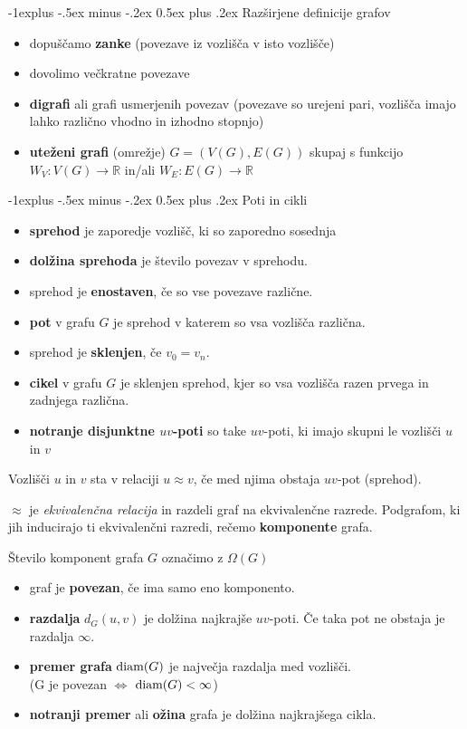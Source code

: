 \documentclass[a4paper,8pt]{extarticle}
\makeatletter
\renewcommand{\subsection}{\@startsection{subsection}{2}{0mm}%
                                {-1explus -.5ex minus -.2ex}%
                                {0.5ex plus .2ex}%
                                {\normalfont\normalsize\bfseries}}
\makeatother
\begin{document}
\begin{multicols}{4}
\subsection{Razširjene definicije grafov}
\begin{itemize}
    \item dopuščamo \textbf{zanke} (povezave iz vozlišča v isto vozlišče)
    \item dovolimo večkratne povezave
    \item \textbf{digrafi} ali grafi usmerjenih povezav (povezave so urejeni pari, vozlišča imajo lahko različno vhodno in izhodno stopnjo)
    \item \textbf{uteženi grafi} (omrežje) $G = (V(G), E(G))$ skupaj s funkcijo $W_V : V(G) \to \mathbb{R}$ in/ali $W_E: E(G) \to \mathbb{R}$
\end{itemize}

\subsection{Poti in cikli}
\begin{itemize}
    \item \textbf{sprehod} je zaporedje vozlišč, ki so zaporedno sosednja
    \item \textbf{dolžina sprehoda} je število povezav v sprehodu.
    \item sprehod je \textbf{enostaven}, če so vse povezave različne.
    \item \textbf{pot} v grafu $G$ je sprehod v katerem so vsa vozlišča različna.
    \item sprehod je \textbf{sklenjen}, če $v_0 = v_n$.
    \item \textbf{cikel} v grafu $G$ je sklenjen sprehod, kjer so vsa vozlišča razen prvega in zadnjega različna.
    \item \textbf{notranje disjunktne $uv$-poti} so take $uv$-poti, ki imajo skupni le vozlišči $u$ in $v$
\end{itemize}

Vozlišči $u$ in $v$ sta v relaciji $u \approx v$, če med njima obstaja $uv$-pot (sprehod).

$\approx$ je \emph{ekvivalenčna relacija} in razdeli graf na ekvivalenčne razrede. 
Podgrafom, ki jih inducirajo ti ekvivalenčni razredi, rečemo \textbf{komponente} grafa.

Število komponent grafa $G$ označimo z $\Omega(G)$

\begin{itemize}
    \item graf je \textbf{povezan}, če ima samo eno komponento.
    \item \textbf{razdalja} $d_G(u,v)$ je dolžina najkrajše $uv$-poti. Če taka pot ne obstaja je razdalja $\infty$.
    \item \textbf{premer grafa} $\textmd{diam}(G)$ je največja razdalja med vozlišči.\\
    (G je povezan $\Leftrightarrow$ $\textmd{diam}(G) < \infty$)
    \item \textbf{notranji premer} ali \textbf{ožina} grafa je dolžina najkrajšega cikla.
\end{itemize}


\end{multicols}
\end{document}
